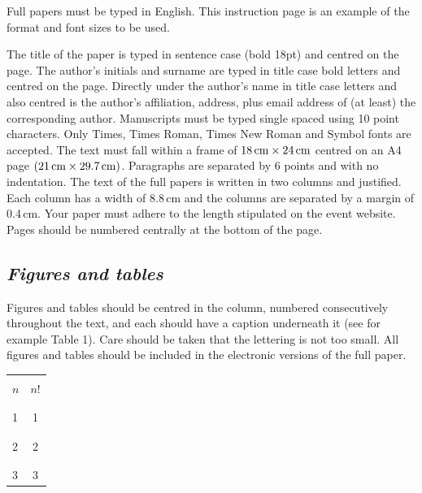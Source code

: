 \documentclass[12pt]{IET02}
\begin{document}
Full papers must be typed in English. This instruction page is an
example of the format and font sizes to be used.

The title of the paper is typed in sentence case (bold 18pt) and
centred on the page. The author's initials and surname are typed
in title case bold letters and centred on the page. Directly under
the author's name in title case letters and also centred is the
author's affiliation, address, plus email address of (at least)
the corresponding author. Manuscripts must be typed single spaced
using 10 point characters. Only Times, Times Roman, Times New
Roman and Symbol fonts are accepted. The text must fall within a
frame of $18\,\hbox{cm} \times 24\,\hbox{cm}$ centred on an A4
page $(21\,\hbox{cm} \times 29.7\,\hbox{cm})$. Paragraphs are
separated by 6 points and with no indentation. The text of the
full papers is written in two columns and justified. Each column
has a width of 8.8\,cm and the columns are separated by a margin
of 0.4\,cm. Your paper must adhere to the length stipulated on the
event website. Pages should be numbered centrally at the bottom of
the page.

\subsection{\it Figures and tables}

Figures and tables should be centred in the column, numbered
consecutively throughout the text, and each should have a caption
underneath it (see for example Table 1). Care should be taken that
the lettering is not too small. All figures and tables should be
included in the electronic versions of the full paper.

\begin{table}[h]%
{\begin{tabular}{@{}|@{\ \ \qquad}l@{\ \ \qquad}|@{\ \ \qquad}c@{\ \ \qquad}|@{}}\hline
 &\\[-.6pc]
$n$ &$n$! \\[-.6pc]
 &\\\hline
 &\\[-.6pc]
1 &1\\[-.6pc]
 &\\\hline
 &\\[-.6pc]
2 &2\\[-.6pc]
 &\\\hline
 &\\[-.6pc]
3 &3\\[.2pc]\hline
\end{tabular}}{}
\end{table}
\end{document}
